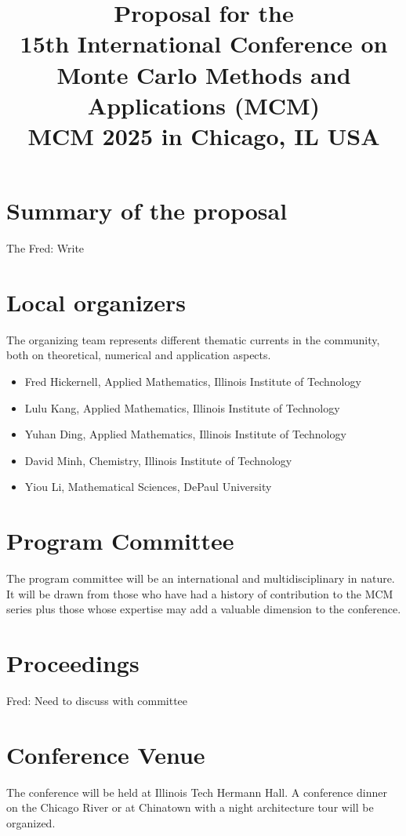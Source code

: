\documentclass{article}
\title{Proposal for the \\
15th International Conference on Monte Carlo Methods and Applications (MCM)\\
MCM 2025 in Chicago, IL USA}
\newcommand{\FJH}[1]{{\color{blue}Fred: #1}}
\begin{document}
\maketitle

\section{Summary of the proposal}
The \FJH{Write}

\section{Local organizers}
 The organizing team represents different thematic currents in the
community, both on theoretical, numerical and application aspects.
\begin{itemize}
    \item  Fred Hickernell, Applied Mathematics, Illinois Institute of Technology
    \item  Lulu Kang, Applied Mathematics, Illinois Institute of Technology
    \item  Yuhan Ding, Applied Mathematics, Illinois Institute of Technology
    \item  David Minh, Chemistry, Illinois Institute of Technology
    \item  Yiou Li, Mathematical Sciences, DePaul University
\end{itemize}

\section{Program Committee}
The program committee will be an international and multidisciplinary in nature.  It will be drawn from those who have had a history of contribution to the MCM series plus those whose expertise may add a valuable dimension to the conference.

\section{Proceedings}

\FJH{Need to discuss with committee}

\section{Conference Venue}

The conference will be held at Illinois Tech Hermann Hall. 
A conference dinner on the Chicago River or at Chinatown with a night architecture tour will be organized.
\end{document}
